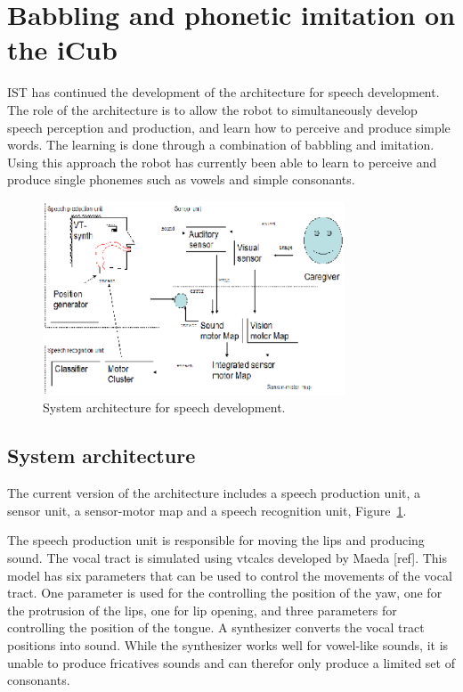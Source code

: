 \section{Babbling and phonetic imitation on the iCub}

IST has continued the development of the architecture for speech
development. The role of the architecture is to allow the robot to
simultaneously develop speech perception and production, and learn how
to perceive and produce simple words. The learning is done through a
combination of babbling and imitation. Using this approach the robot
has currently been able to learn to perceive and produce single
phonemes such as vowels and simple consonants. 
\begin{figure}
\centering
\includegraphics[width=0.8\textwidth]{include/babbling/images/arch.eps}
\caption{System architecture for speech development.}
\label{fig:babbling:arch}
\end{figure}

\subsection{System architecture}
The current version of the architecture includes a speech production
unit, a sensor unit, a sensor-motor map and a speech recognition unit,
Figure~\ref{fig:babbling:arch}.

The speech production unit is responsible for moving the lips and
producing sound. The vocal tract is simulated using vtcalcs developed
by Maeda [ref]. This model has six parameters that can be used to
control the movements of the vocal tract. One parameter is used for
the controlling the position of the yaw, one for the protrusion of the
lips, one for lip opening, and three parameters for controlling the
position of the tongue. A synthesizer converts the vocal tract
positions into sound. While the synthesizer works well for vowel-like
sounds, it is unable to produce fricatives sounds and can therefor
only produce a limited set of consonants.

